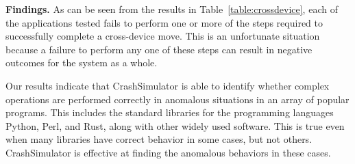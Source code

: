 {\bf Findings.}
As can be seen from the results in Table~\ref{table:crossdevice}, each of the
applications tested fails to perform one or more of the steps required to
successfully complete a cross-device move.  This is an unfortunate situation
because a failure to perform any one of these steps can result in negative
outcomes for the system as a whole.

Our results indicate that CrashSimulator is able to identify whether complex
operations are performed correctly in anomalous situations in
an array of popular programs.  
This includes the standard libraries for the programming languages Python,
Perl, and Rust, along with other widely used software.  This is true even
when many libraries have correct behavior in some cases, but not others.
CrashSimulator is effective at finding the anomalous behaviors in these
cases.

%

